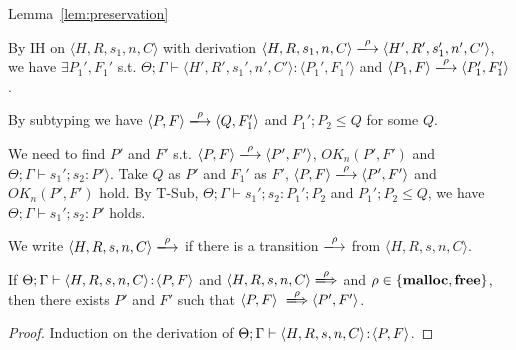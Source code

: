 \begin{pfof}{Lemma~\ref{lem:preservation}}
\begin{itemize}
  By IH on \( \langle H, R, s_1, n, C \rangle \) with derivation \(
  \langle H, R, s_1, n, C \rangle \xlongrightarrow{\rho} \langle H',
  R', s_1', n', C' \rangle\), we have \(\exists P_1',F_1'\)
  s.t. \(\Theta; \Gamma \vdash \langle H', R', s_1', n', C' \rangle :
  \langle P_1', F_1' \rangle\) and \( \langle P_1, F \rangle
  \xlongrightarrow{\rho} \langle P_1', F_1' \rangle\).

  By subtyping we have \( \langle P, F \rangle \xlongrightarrow{\rho}
  \langle Q, F_1' \rangle \) and \(P_1';P_2 \le Q\) for some \(Q\).

  We need to find \(P'\) and \(F'\) s.t. \( \langle P, F \rangle
  \xlongrightarrow{\rho} \langle P', F' \rangle \), \( OK_n(P', F')\)
  and \(\Theta; \Gamma \vdash s_1';s_2 : P' \rangle\).  Take \(Q\) as
  \(P'\) and \(F_1'\) as \(F'\), \( \langle P, F \rangle
  \xlongrightarrow{\rho} \langle P', F' \rangle \) and \( OK_n(P',
  F')\) hold. By T-Sub, \(\Theta; \Gamma \vdash s_1';s_2 : P_1';P_2\)
  and \(P_1';P_2 \le Q\), we have \(\Theta; \Gamma \vdash s_1';s_2 :
  P'\) holds.

\end{itemize}
\end{pfof}  


We write \(\langle H, R, s, n, C \rangle \xlongrightarrow{\rho}\) if
there is a transition \(\xlongrightarrow{\rho}\) from \(\langle H, R,
s, n, C \rangle\).

\begin{lemma}
\label{lem:enabled}
If \(\Theta; \Gamma \vdash \langle H, R, s, n, C \rangle \!:\! \langle
P,F \rangle\) and \(\langle H, R, s, n, C \rangle
\xLongrightarrow{\rho}\) and \(\rho \in \{\mathbf{malloc}, \mathbf{free}\}\), then
there exists \(P'\) and \(F'\) such that \( \langle P, F \rangle
\ \xLongrightarrow{\rho} \langle P', F'\rangle\).
\end{lemma}

\begin{proof}
Induction on the derivation of \(\Theta; \Gamma \vdash \langle H, R, s, n, C \rangle \!:\! \langle P, F \rangle\).
\end{proof}


